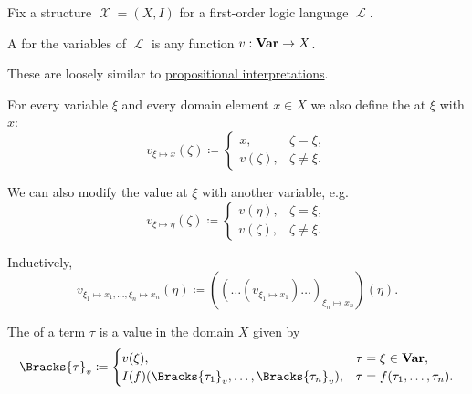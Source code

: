\begin{definition}\label{def:first_order_valuation}
  Fix a structure \( \mscrX = (X, I) \) for a first-order logic language \( \mscrL \).

  \begin{thmenum}
     A  for the variables of \( \mscrL \) is any function \( v: \operatorname{\mathbf{Var}} \to X \).

    These are loosely similar to \hyperref[def:propositional_valuation/interpretation]{propositional interpretations}.

     For every variable \( \xi \) and every domain element \( x \in X \) we also define the  at \( \xi \) with \( x \):
    \begin{equation*}
      v_{\xi \mapsto x}(\zeta) \coloneqq \begin{cases}
        x,        &\zeta = \xi, \\
        v(\zeta), &\zeta \neq \xi.
      \end{cases}
    \end{equation*}

    We can also modify the value at \( \xi \) with another variable, e.g.
    \begin{equation*}
      v_{\xi \mapsto \eta}(\zeta) \coloneqq \begin{cases}
        v(\eta),  &\zeta = \xi, \\
        v(\zeta), &\zeta \neq \xi.
      \end{cases}
    \end{equation*}

    Inductively,
    \begin{equation*}
      v_{\xi_1 \mapsto x_1, \ldots, \xi_n \mapsto x_n}(\eta) \coloneqq ((\ldots(v_{\xi_1 \mapsto x_1})\ldots)_{\xi_n \mapsto x_n})(\eta).
    \end{equation*}

     The  of a term \( \tau \) is a value in the domain \( X \) given by
    \begin{equation}\label{eq:def:first_order_valuation/term_valuation}
      \Bracks{\tau}_v \coloneqq \begin{cases}
        v(\xi),                                             &\tau = \xi \in \boldop{Var}, \\
        I(f)(\Bracks{\tau_1}_v, \ldots, \Bracks{\tau_n}_v), &\tau = f(\tau_1, \ldots, \tau_n).
      \end{cases}
    \end{equation}


\end{thmenum}
\end{definition}
